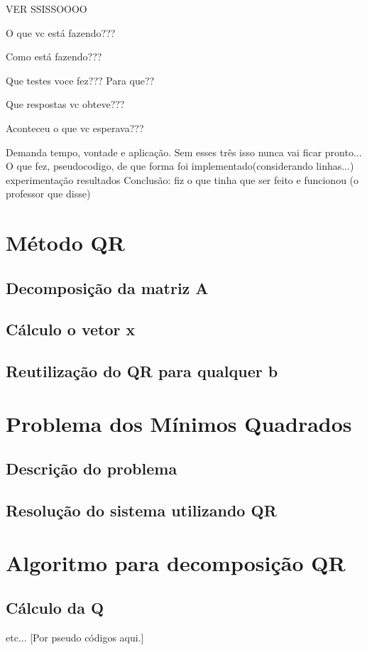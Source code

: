 
VER SSISSOOOO

O que vc está fazendo???

Como está fazendo???

Que testes voce fez??? Para que??

Que respostas vc obteve???

Aconteceu o que vc esperava???

Demanda tempo, vontade e aplicação. Sem esses três isso nunca vai ficar pronto...
O que fez, pseudocodigo, de que forma foi implementado(considerando linhas...)  experimentação
resultados
Conclusão: fiz o que tinha que ser feito e funcionou (o professor que disse)
 
\chapter{Método QR}

	\section{Decomposição da matriz A}

	\section{Cálculo o vetor x}

	\section{Reutilização do QR para qualquer b}


\chapter{Problema dos Mínimos Quadrados}

	\section{Descrição do problema}

	\section{Resolução do sistema utilizando QR}


\chapter{Algoritmo para decomposição QR}

\section{Cálculo da Q}
etc... [Por pseudo códigos aqui.]
